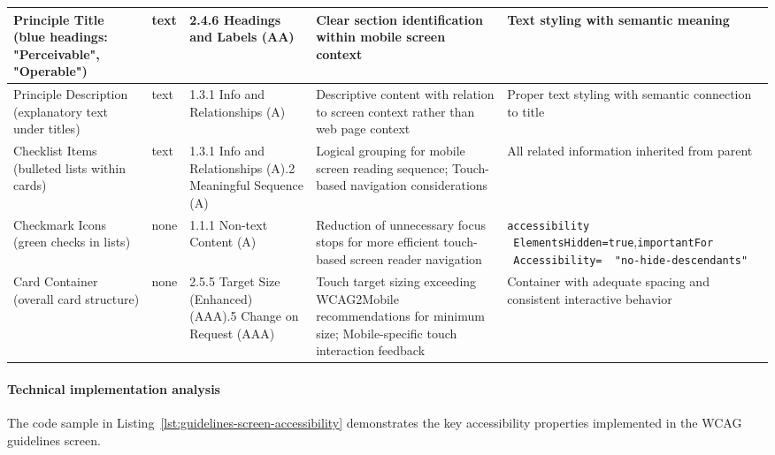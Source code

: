 \begin{longtable}[c]{|C{2.5cm}|C{2cm}|C{2.8cm}|C{3.2cm}|C{4.7cm}|}
\hline
Principle Title (blue headings: "Perceivable", "Operable") & text & 2.4.6 Headings and Labels (AA) & Clear section identification within mobile screen context & Text styling with semantic meaning \\
\hline
Principle Description (explanatory text under titles) & text & 1.3.1 Info and Relationships (A) & Descriptive content with relation to screen context rather than web page context & Proper text styling with semantic connection to title \\
\hline
Checklist Items (bulleted lists within cards) & text & 1.3.1 Info and Relationships (A).2 Meaningful Sequence (A) & Logical grouping for mobile screen reading sequence; Touch-based navigation considerations & All related information inherited from parent \\
\hline
Checkmark Icons (green checks in lists) & none & 1.1.1 Non-text Content (A) & Reduction of unnecessary focus stops for more efficient touch-based screen reader navigation & \texttt{accessibility \ ElementsHidden=true},\newline \texttt{importantFor \ Accessibility= \ "no-hide-descendants"} \\
\hline
Card Container (overall card structure) & none & 2.5.5 Target Size (Enhanced) (AAA).5 Change on Request (AAA) & Touch target sizing exceeding WCAG2Mobile recommendations for minimum size; Mobile-specific touch interaction feedback & Container with adequate spacing and consistent interactive behavior \\
\hline
\end{longtable}

\FloatBarrier

\paragraph{Technical implementation analysis}

The code sample in Listing~\ref{lst:guidelines-screen-accessibility} demonstrates the key accessibility properties implemented in the WCAG guidelines screen.


